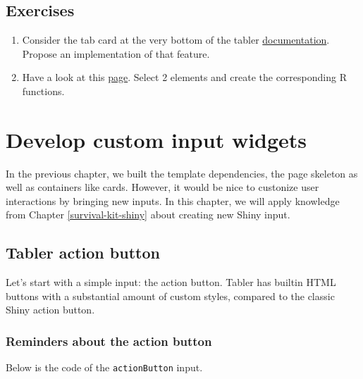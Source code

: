 \documentclass[]{book}
\providecommand{\tightlist}{%
  \setlength{\itemsep}{0pt}\setlength{\parskip}{0pt}}
\begin{document}
\hypertarget{exercises}{%
\section{Exercises}\label{exercises}}

\begin{enumerate}
\def\labelenumi{\arabic{enumi}.}
\tightlist
\item
  Consider the tab card at the very bottom of the tabler \href{https://preview-dev.tabler.io/docs/cards.html}{documentation}. Propose an implementation of that feature.
\item
  Have a look at this \href{https://preview-dev.tabler.io/snippets.html}{page}. Select 2 elements and create the corresponding R functions.
\end{enumerate}

\hypertarget{custom-templates-inputs}{%
\chapter{Develop custom input widgets}\label{custom-templates-inputs}}

In the previous chapter, we built the template dependencies, the page skeleton as well as containers like cards. However, it would be nice to custonize user interactions by bringing new inputs. In this chapter, we will apply knowledge from Chapter \ref{survival-kit-shiny} about creating new Shiny input.

\hypertarget{tabler-action-button}{%
\section{Tabler action button}\label{tabler-action-button}}

Let's start with a simple input: the action button. Tabler has builtin HTML buttons with a substantial amount of custom styles, compared to the classic Shiny action button.

\hypertarget{reminders-about-the-action-button}{%
\subsection{Reminders about the action button}\label{reminders-about-the-action-button}}

Below is the code of the \texttt{actionButton} input.
\end{document}

